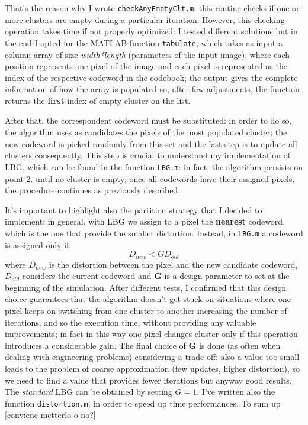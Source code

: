 \documentclass{report}
\def\code#1{\texttt{#1}}
\begin{document}
That's the reason why I wrote \code{checkAnyEmptyClt.m}: this routine checks if one or more clusters are empty during a particular iteration. However, this checking operation takes time if not properly optimized: I tested different solutions but in the end I opted for the MATLAB function \code{tabulate}, which takes as input a column array of size \textit{width*length} (parameters of the input image), where each position represents one pixel of the image and each pixel is represented as the index of the respective codeword in the codebook; the output gives the complete information of how the array is populated so, after few adjustments, the function returns the \textbf{first} index of empty cluster on the list. 

After that, the correspondent codeword must be substituted: in order to do so, the algorithm uses as candidates the pixels of the most populated cluster; the new codeword is picked randomly from this set and the last step is to update all clusters consequently. This step is crucial to understand my implementation of LBG, which can be found in the function \code{LBG.m}: in fact, the algorithm persists on point 2. until no cluster is empty; once all codewords have their assigned pixels, the procedure continues as previously described.

It's important to highlight also the partition strategy that I decided to implement: in general, with LBG we assign to a pixel the \textbf{nearest} codeword, which is the one that provide the smaller distortion. Instead, in \code{LBG.m} a codeword is assigned only if: 
\begin{equation}
D_{new} < GD_{old}
\end{equation}
where $D_{new}$ is the distortion between the pixel and the new candidate codeword, $D_{old}$ considers the current codeword and \textbf{G} is a design parameter to set at the beginning of the simulation. After different tests, I confirmed that this design choice guarantees that the algorithm doesn't get stuck on situations where one pixel keeps on switching from one cluster to another increasing the number of iterations, and so the execution time, without providing any valuable improvements; in fact in this way one pixel changes cluster only if this operation introduces a considerable gain. The final choice of \textbf{G} is done (as often when dealing with engineering problems) considering a trade-off: also a value too small leads to the problem of coarse approximation (few updates, higher distortion), so we need to find a value that provides fewer iterations but anyway good results. The \textit{standard} LBG can be obtained by setting $G = 1$.
I've written also the function \code{distortion.m}, in order to speed up time performances.
To sum up [conviene metterlo o no?]
\end{document}
